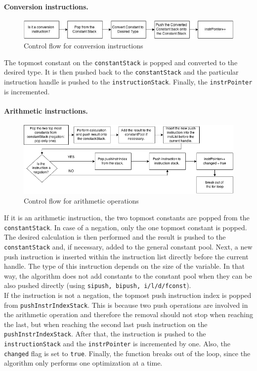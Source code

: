 \paragraph{Conversion instructions.}
\begin{figure}[h!]
\centering
\includegraphics[scale=0.6]{figures/conversion}
\caption{Control flow for conversion instructions}
\end{figure}

The topmost constant on the \texttt{constantStack} is popped and converted to the desired type. It is then pushed back to the \texttt{constantStack} and the particular instruction handle is pushed to the \texttt{instructionStack}. Finally, the \texttt{instrPointer} is incremented. 

\paragraph{Arithmetic instructions.}
\begin{figure}[h!]
\includegraphics[scale=0.6]{figures/arithmetic}
\caption{Control flow for arithmetic operations}
\end{figure}

If it is an arithmetic instruction, the two topmost constants are popped from the \texttt{constantStack}. In case of a negation, only the one topmost constant is popped. The desired calculation is then performed and the result is pushed to the \texttt{constantStack} and, if necessary, added to the general constant pool. Next, a new push instruction is inserted within the instruction list directly before the current handle. The type of this instruction depends on the size of the variable. In that way, the algorithm does not add constants to the constant pool when they can be also pushed directly (using \texttt{sipush, bipush, i/l/d/fconst}).\\
If the instruction is not a negation, the topmost push instruction index is popped from \texttt{pushInstrIndexStack}. This is because two push operations are involved in the arithmetic operation and therefore the removal should not stop when reaching the last, but when reaching the second last push instruction on the \texttt{pushInstrIndexStack}. After that, the instruction is pushed to the \texttt{instructionStack} and the \texttt{instrPointer} is incremented by one. Also, the \texttt{changed} flag is set to \texttt{true}. Finally, the function breaks out of the loop, since the algorithm only performs one optimization at a time.

